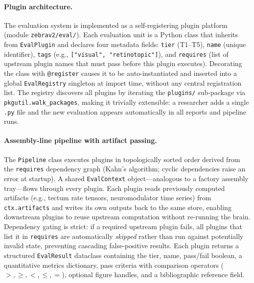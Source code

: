 \documentclass[12pt]{article}
\begin{document}
\paragraph{Plugin architecture.}
The evaluation system is implemented as a self-registering plugin
platform (module \texttt{zebrav2/eval/}).
Each evaluation unit is a Python class that inherits from
\texttt{EvalPlugin} and declares four metadata fields:
\texttt{tier} (T1--T5), \texttt{name} (unique identifier),
\texttt{tags} (e.g., \texttt{["visual", "retinotopic"]}), and
\texttt{requires} (list of upstream plugin names that must pass
before this plugin executes).
Decorating the class with \texttt{@register} causes it to be
auto-instantiated and inserted into a global \texttt{EvalRegistry}
singleton at import time, without any central registration list.
The registry discovers all plugins by iterating the
\texttt{plugins/} sub-package via \texttt{pkgutil.walk\_packages},
making it trivially extensible: a researcher adds a single
\texttt{.py} file and the new evaluation appears automatically in
all reports and pipeline runs.

\paragraph{Assembly-line pipeline with artifact passing.}
The \texttt{Pipeline} class executes plugins in topologically sorted
order derived from the \texttt{requires} dependency graph (Kahn's
algorithm; cyclic dependencies raise an error at startup).
A shared \texttt{EvalContext} object---analogous to a factory assembly
tray---flows through every plugin.
Each plugin reads previously computed artifacts (e.g., tectum rate
tensors, neuromodulator time series) from \texttt{ctx.artifacts} and
writes its own outputs back to the same store, enabling downstream
plugins to reuse upstream computation without re-running the brain.
Dependency gating is strict: if a required upstream plugin fails,
all plugins that list it in \texttt{requires} are automatically
\emph{skipped} rather than run against potentially invalid state,
preventing cascading false-positive results.
Each plugin returns a structured \texttt{EvalResult} dataclass
containing the tier, name, pass/fail boolean, a quantitative metrics
dictionary, pass criteria with comparison operators
($>, \ge, <, \le, =$), optional figure handles, and a bibliographic
reference field.
\end{document}
